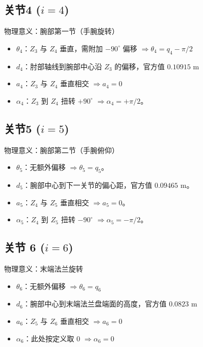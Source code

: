 \documentclass[a4paper,12pt]{article}
\begin{document}
\subsection*{关节4 ($i=4$)}
物理意义：腕部第一节（手腕旋转）
\begin{itemize}
    \item $\theta_4$：$Z_3$ 与 $Z_4$ 垂直，需附加 $-90^\circ$ 偏移 $\Rightarrow \theta_4 = q_4 - \pi/2$
    \item $d_4$：肘部轴线到腕部中心沿 $Z_3$ 的偏移，官方值 $0.10915$ m
    \item $a_4$：$Z_3$ 与 $Z_4$ 垂直相交 $\Rightarrow a_4 = 0$
    \item $\alpha_4$：$Z_3$ 到 $Z_4$ 扭转 $+90^\circ$ $\Rightarrow \alpha_4 = +\pi/2$。
\end{itemize}

\subsection*{关节5 ($i=5$)}
物理意义：腕部第二节（手腕俯仰）
\begin{itemize}
    \item $\theta_5$：无额外偏移 $\Rightarrow \theta_5 = q_5$。
    \item $d_5$：腕部中心到下一关节的偏心距，官方值 $0.09465$ m。
    \item $a_5$：$Z_4$ 与 $Z_5$ 垂直相交 $\Rightarrow a_5 = 0$。
    \item $\alpha_5$：$Z_4$ 到 $Z_5$ 扭转 $-90^\circ$ $\Rightarrow \alpha_5 = -\pi/2$。
\end{itemize}

\subsection*{关节 6 ($i=6$)}
物理意义：末端法兰旋转
\begin{itemize}
    \item $\theta_6$：无额外偏移 $\Rightarrow \theta_6 = q_6$
    \item $d_6$：腕部中心到末端法兰盘端面的高度，官方值 $0.0823$ m
    \item $a_6$：$Z_5$ 与 $Z_6$ 垂直相交 $\Rightarrow a_6 = 0$
    \item $\alpha_6$：此处按定义取 $0$ $\Rightarrow \alpha_6 = 0$
\end{itemize}
\end{document}
